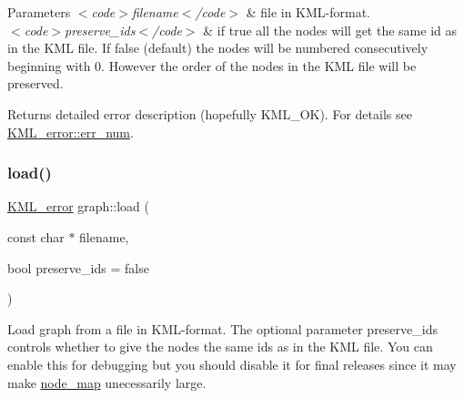 \begin{DoxyParams}{Parameters}
{\em $<$code$>$filename$<$/code$>$} & file in K\+M\+L-\/format. ~\newline
\\
\hline
{\em $<$code$>$preserve\+\_\+ids$<$/code$>$} & if true all the nodes will get the same id as in the K\+ML file. If false (default) the nodes will be numbered consecutively beginning with 0. However the order of the nodes in the K\+ML file will be preserved. \\
\hline
\end{DoxyParams}
\begin{DoxyReturn}{Returns}
detailed error description (hopefully K\+M\+L\+\_\+\+OK). For details see \mbox{\hyperlink{struct_k_m_l__error_af529c360a62a01e2db8ed6b4a9ee0bf2}{K\+M\+L\+\_\+error\+::err\+\_\+num}}. 
\end{DoxyReturn}
\mbox{\label{classgraph_a86fd7887c749213b5168d5eadd6228eb}} 
\subsubsection{\texorpdfstring{load()}{load()}\hspace{0.1cm}{\footnotesize\ttfamily [2/2]}}
{\footnotesize\ttfamily \mbox{\hyperlink{struct_k_m_l__error}{K\+M\+L\+\_\+error}} graph\+::load (\begin{DoxyParamCaption}\item[{const char $\ast$}]{filename,  }\item[{bool}]{preserve\+\_\+ids = {\ttfamily false} }\end{DoxyParamCaption})}

Load graph from a file in K\+M\+L-\/format. The optional parameter {\ttfamily preserve\+\_\+ids} controls whether to give the nodes the same ids as in the K\+ML file. You can enable this for debugging but you should disable it for final releases since it may make {\ttfamily \mbox{\hyperlink{classnode__map}{node\+\_\+map}}} unecessarily large. ~\newline
 
